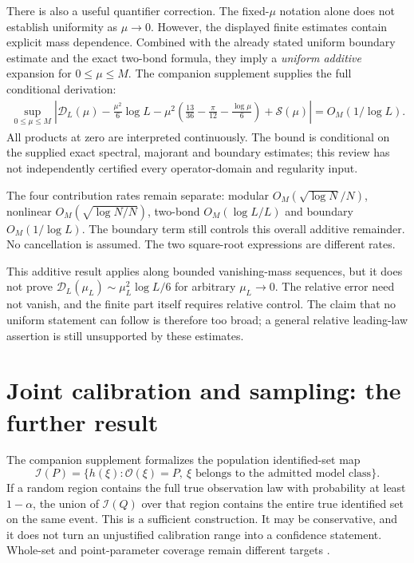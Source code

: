 \documentclass[11pt,a4paper]{article}
\begin{document}
There is also a useful quantifier correction. The fixed-$\mu$ notation alone does not establish uniformity as $\mu\to0$. However, the displayed finite estimates contain explicit mass dependence. Combined with the already stated uniform boundary estimate and the exact two-bond formula, they imply a \emph{uniform additive} expansion for $0\le\mu\le M$. The companion supplement supplies the full conditional derivation:
\begin{align*}
\sup_{0\le\mu\le M}\left|\mathcal D_L(\mu)
-\frac{\mu^2}{6}\log L
-\mu^2\left(\frac{13}{36}-\frac\pi{12}-\frac{\log\mu}{6}\right)
+\mathcal S(\mu)\right|
=O_M(1/\log L).
\end{align*}
All products at zero are interpreted continuously. The bound is conditional on the supplied exact spectral, majorant and boundary estimates; this review has not independently certified every operator-domain and regularity input.

The four contribution rates remain separate: modular $O_M(\sqrt{\log N}/N)$, nonlinear $O_M(\sqrt{\log N/N})$, two-bond $O_M(\log L/L)$ and boundary $O_M(1/\log L)$. The boundary term still controls this overall additive remainder. No cancellation is assumed. The two square-root expressions are different rates.

This additive result applies along bounded vanishing-mass sequences, but it does not prove $\mathcal D_L(\mu_L)\sim\mu_L^2\log L/6$ for arbitrary $\mu_L\to0$. The relative error need not vanish, and the finite part itself requires relative control. The claim that no uniform statement can follow is therefore too broad; a general relative leading-law assertion is still unsupported by these estimates.

\section{Joint calibration and sampling: the further result}

The companion supplement formalizes the population identified-set map
\[
\mathcal I(P)=\{h(\xi):\mathcal O(\xi)=P,\ \xi\text{ belongs to the admitted model class}\}.
\]
If a random region contains the full true observation law with probability at least $1-\alpha$, the union of $\mathcal I(Q)$ over that region contains the entire true identified set on the same event. This is a sufficient construction. It may be conservative, and it does not turn an unjustified calibration range into a confidence statement. Whole-set and point-parameter coverage remain different targets \cite{romano}.
\end{document}
